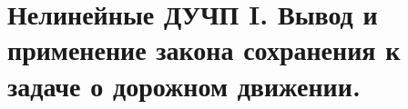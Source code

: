\section{Нелинейные ДУЧП I. Вывод и применение закона сохранения к задаче о
дорожном движении.}

\newpage
